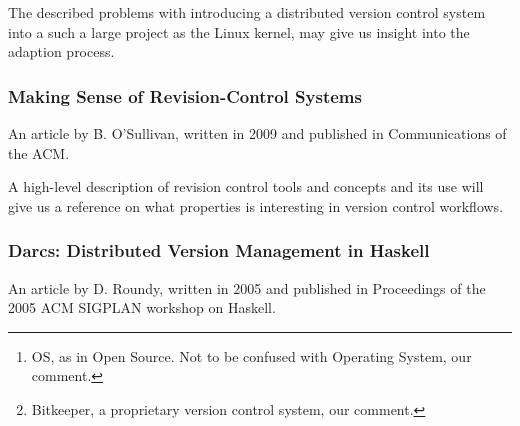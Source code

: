 \documentclass{article}
\begin{document}
\begin{abstract}
 Version management tools might be seen as a prerequisite for open
 source development today as projects become too large to be managed by
 maintainers alone. Yet the OS\footnote{ 
  OS, as in Open Source. Not to be confused with Operating System, our 
  comment.
 } process depends on fluid coordination and collaboration with the
 underlying qualities of this process based on firm trust and
 respect for fellow developers. This paper is a study of how
 debate over version tools reflects governance and decision making
 in an OS community. The paper is based on a study of the Linux kernel
 community as it first saw a partial acceptance of the CVS tool, and then
 later adopted BK\footnote{
  Bitkeeper, a proprietary version control system, our comment. 
 }. The paper explains the adoption process in relation to governance
 concerns, license issues, and questions of technical performance.
\end{abstract}

The described problems with introducing a distributed version control
system into a such a large project as the Linux kernel, may give us 
insight into the adaption process.

\subsubsection{Making Sense of Revision-Control Systems}

An article by B. O'Sullivan, written in 2009 and published in
Communications of the ACM\cite{osullivan09}.

\begin{abstract}
 All revision-control systems come with complicated sets of trade-offs. How
 do you find the best match between tool and team?
\end{abstract}

A high-level description of revision control tools and concepts and its use
will give us a reference on what properties is interesting in version
control workflows.

\subsubsection{Darcs: Distributed Version Management in Haskell}

An article by D. Roundy, written in 2005 and published in Proceedings of the
2005 ACM SIGPLAN workshop on Haskell\cite{roundy05}.
\end{document}
